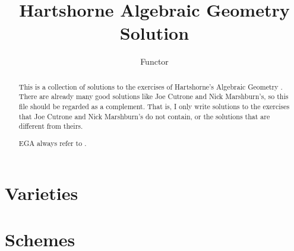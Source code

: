 \documentclass{article}
\title{Hartshorne Algebraic Geometry Solution}
\author{Functor}
\begin{document}
\maketitle

\begin{abstract}
This is a collection of solutions to the exercises of Hartshorne's Algebraic Geometry \cite{Hartshorne1977AlgebraicG}. There are already many good solutions like Joe Cutrone and Nick Marshburn's, so this file should be regarded as a complement. That is, I only write solutions to the exercises that Joe Cutrone and Nick Marshburn's do not contain, or the solutions that are different from theirs.

EGA always refer to \cite{EGA}.
\end{abstract}

\section{Varieties}

\section{Schemes}
\end{document}
